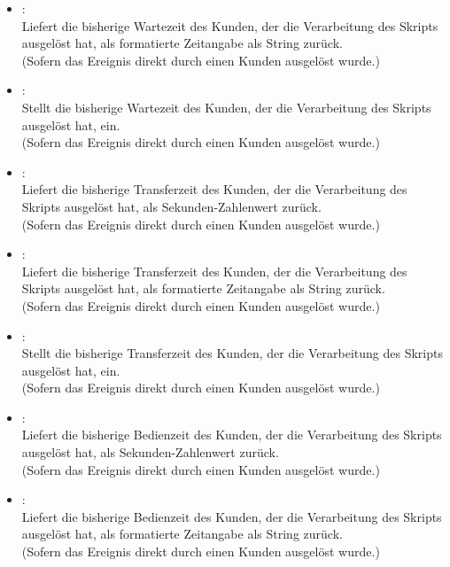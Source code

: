 \begin{itemize}
\item
{}:\\
Liefert die bisherige Wartezeit des Kunden, der die Verarbeitung des Skripts ausgelöst hat, als formatierte Zeitangabe als String zurück.\\
(Sofern das Ereignis direkt durch einen Kunden ausgelöst wurde.)

\item
{}:\\
Stellt die bisherige Wartezeit des Kunden, der die Verarbeitung des Skripts ausgelöst hat, ein.\\
(Sofern das Ereignis direkt durch einen Kunden ausgelöst wurde.)

\item
{}:\\
Liefert die bisherige Transferzeit des Kunden, der die Verarbeitung des Skripts ausgelöst hat, als Sekunden-Zahlenwert zurück.\\
(Sofern das Ereignis direkt durch einen Kunden ausgelöst wurde.)

\item
{}:\\
Liefert die bisherige Transferzeit des Kunden, der die Verarbeitung des Skripts ausgelöst hat, als formatierte Zeitangabe als String zurück.\\
(Sofern das Ereignis direkt durch einen Kunden ausgelöst wurde.)

\item
{}:\\
Stellt die bisherige Transferzeit des Kunden, der die Verarbeitung des Skripts ausgelöst hat, ein.\\
(Sofern das Ereignis direkt durch einen Kunden ausgelöst wurde.)

\item
{}:\\
Liefert die bisherige Bedienzeit des Kunden, der die Verarbeitung des Skripts ausgelöst hat, als Sekunden-Zahlenwert zurück.\\
(Sofern das Ereignis direkt durch einen Kunden ausgelöst wurde.)

\item
{}:\\
Liefert die bisherige Bedienzeit des Kunden, der die Verarbeitung des Skripts ausgelöst hat, als formatierte Zeitangabe als String zurück.\\
(Sofern das Ereignis direkt durch einen Kunden ausgelöst wurde.)


\end{itemize}
